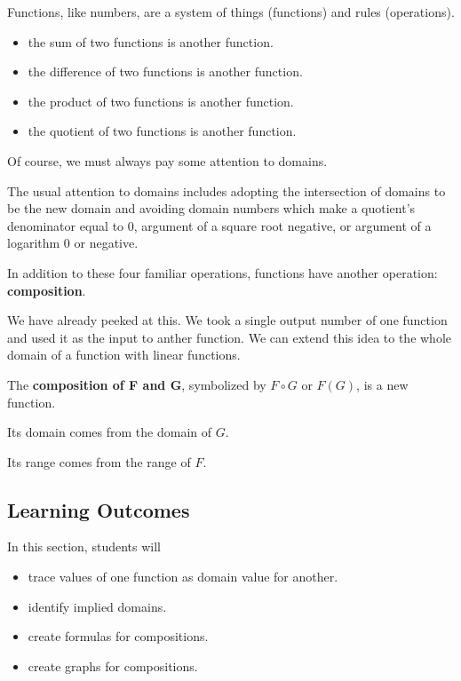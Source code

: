 \documentclass{ximera}
\begin{document}
Functions, like numbers, are a system of things (functions) and rules (operations).  

\begin{itemize}
\item the sum of two functions is another function.
\item the difference of two functions is another function.
\item the product of two functions is another function.
\item the quotient of two functions is another function.
\end{itemize}

Of course, we must always pay some attention to domains.



The usual attention to domains includes adopting the intersection of domains to be the new domain and avoiding domain numbers which make a quotient's denominator equal to $0$, argument of a square root negative, or argument of a logarithm $0$ or negative.



In addition to these four familiar operations, functions have another operation: \textbf{\textcolor{purple!85!blue}{composition}}.

We have already peeked at this. We took a single output number of one function and used it as the input to anther function.  We can extend this idea to the whole domain of a function with linear functions.


The \textbf{\textcolor{purple!85!blue}{composition of F and G}}, symbolized by $F \circ G$ or $F(G)$, is a new function.  

Its domain comes from the domain of $G$. 

Its range comes from the range of $F$.
















\subsection*{Learning Outcomes}


\begin{sectionOutcomes}
In this section, students will 

\begin{itemize}
\item trace values of one function as domain value for another.
\item identify implied domains.
\item create formulas for compositions.
\item create graphs for compositions.
\end{itemize}
\end{sectionOutcomes}
\end{document}
